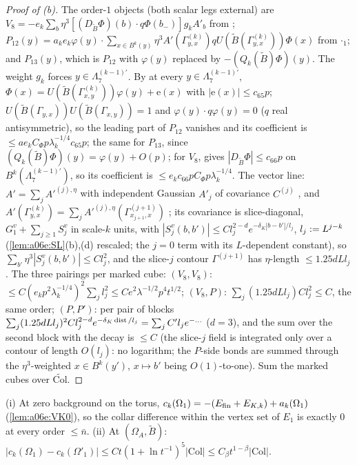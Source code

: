 \begin{proof}[Proof of \textup{(b)}]
The order-$1$ objects (both scalar legs external) are $V_8=-e_k\sum_b\eta^3[(D_{\tilde B}\Phi)(b)\cdot q\Phi(b_-)]g_kA'_b$ from \cite[(1.8)]{Ba3}; $P_{12}(y)=a_ke_k\varphi(y)\cdot\sum_{x\in B^k(y)}\eta^3A'(\Gamma^{(k)}_{y,x})qU(\tilde B(\Gamma^{(k)}_{y,x}))\Phi(x)$ from \cite[(1.12)]{Ba3}$\cdot$\cite[(1.14)]{Ba3}$_1$; and $P_{13}(y)$, which is $P_{12}$ with $\varphi(y)$ replaced by $-(Q_k(\tilde B)\Phi)(y)$. The weight $g_k$ forces $y\in\Lambda^{(k-1)'}_7$. By \cite[Lemma~2.4, (2.65)]{Ba2} at every $y\in\Lambda^{(k-1)'}_7$, $\Phi(x)=U(\tilde B(\Gamma^{(k)}_{x,y}))\varphi(y)+\mathrm e(x)$ with $|\mathrm e(x)|\le c_{65}p$; $U(\tilde B(\Gamma_{y,x}))U(\tilde B(\Gamma_{x,y}))=1$ and $\varphi(y)\cdot q\varphi(y)=0$ ($q$ real antisymmetric), so the leading part of $P_{12}$ vanishes and its coefficient is $\le ae_kC_\Phi p\lambda_k^{-1/4}c_{65}p$; the same for $P_{13}$, since $(Q_k(\tilde B)\Phi)(y)=\varphi(y)+O(p)$; for $V_8$, \cite[(2.66)]{Ba2} gives $|D_{\tilde B}\Phi|\le c_{66}p$ on $B^k(\Lambda^{(k-1)'}_7)$, so its coefficient is $\le e_kc_{66}pC_\Phi p\lambda_k^{-1/4}$. The vector line: $A'=\sum_jA'^{(j),\eta}$ with independent Gaussian $A'_j$ of covariance $C^{(j)}$ \cite[p.~414]{Ba3}, and $A'(\Gamma^{(k)}_{y,x})=\sum_jA'^{(j),\eta}(\Gamma^{(j+1)}_{x_{j+1},x})$ \cite[(1.3), p.~412]{Ba3}; its covariance is slice-diagonal, $G^{v}_1+\sum_{j\ge1}S^v_j$ in scale-$k$ units, with $|S^v_j(b,b')|\le Cl_j^{2-d}e^{-\delta_K|b-b'|/l_j}$, $l_j:= L^{j-k}$ (\cref{lem:a06e:SL}(b),(d) rescaled; the $j=0$ term with its $L$-dependent constant), so $\sum_{b'}\eta^3|S^v_j(b,b')|\le Cl_j^2$, and the slice-$j$ contour $\Gamma^{(j+1)}$ has $\eta$-length $\le1.25dLl_j$. The three pairings per marked cube: $(V_8,V_8)$: $\le C(e_kp^2\lambda_k^{-1/4})^2\sum_jl_j^2\le Ce^2\lambda^{-1/2}p^4t^{1/2}$; $(V_8,P)$: $\sum_j(1.25dLl_j)Cl_j^2\le C$, the same order; $(P,P')$: per pair of blocks $\sum_j(1.25dLl_j)^2Cl_j^{2-d}e^{-\delta_K\operatorname{dist}/l_j}=\sum_jC'l_je^{-\dots}$ ($d=3$), and the sum over the second block with the decay is $\le C$ (the slice-$j$ field is integrated only over a contour of length $O(l_j)$: no logarithm; the $P$-side bonds are summed through the $\eta^3$-weighted $x\in B^k(y')$, $x\mapsto b'$ being $O(1)$-to-one). Sum the marked cubes over $\widetilde{\mathrm{Col}}$.
\end{proof}

\begin{lemma}\label{lem:a06f:C27}
\textup{(i)} At zero background on the torus, $c_k(\Omega_1)=-(E_{\mathrm{fin}}+E_{K,k})+a_k(\Omega_1)$ (\cref{lem:a06e:VK0}), so the collar difference within the vertex set of $E_1$ is exactly $0$ at every order $\le\bar n$. \textup{(ii)} At $(\Omega_A,\tilde B)$: $|c_k(\Omega_1)-c_k(\Omega'_1)|\le Ct(1+\ln t^{-1})^5|\mathrm{Col}|\le C_\beta t^{1-\beta}|\mathrm{Col}|$.
\end{lemma}

